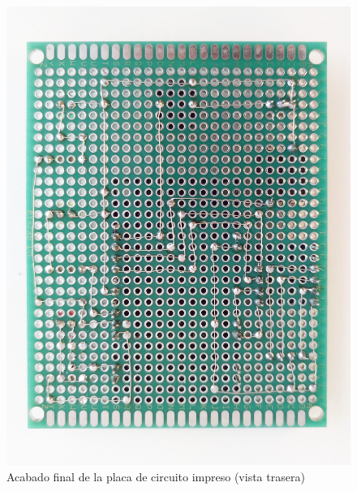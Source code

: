 \vfill

\clearpage

\begin{figure}
  \centering
  \includegraphics[width=0.7\columnwidth]{../photos/interior-pcb-back}
  \caption{Acabado final de la placa de circuito impreso (vista trasera)}
  \label{fig:interior-pcb-back}
\end{figure}

\clearpage

